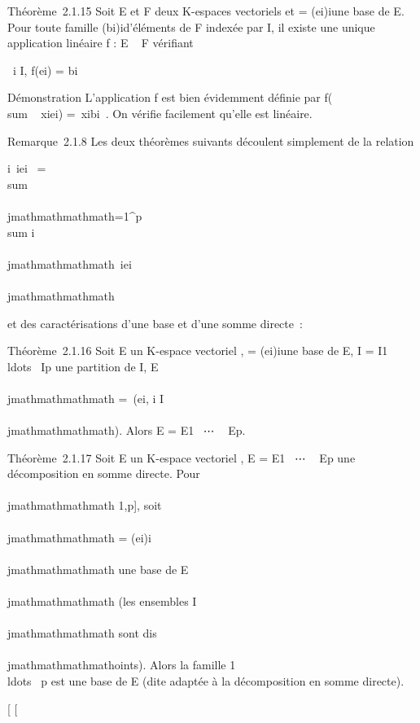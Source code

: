 Théorème~2.1.15 Soit E et F deux K-espaces vectoriels et  =
(ei)i\inI une base de E. Pour toute famille
(bi)i\inI d'éléments de F indexée par I, il existe une
unique application linéaire f : E \rightarrow~ F vérifiant

\forall~i \in I, f(ei) = bi~

Démonstration L'application f est bien évidemment définie par
f(\\sum ~
xiei) =\
\sum  xibi~. On vérifie
facilement qu'elle est linéaire.

Remarque~2.1.8 Les deux théorèmes suivants découlent simplement de la
relation

\sum i\inI\alpha~iei~ =
\\sum
\\\\jmathmathmathmath=1^p\underbrace
\\sum
i\inI\\\\jmathmathmathmath\alpha~iei \inE\\\\jmathmathmathmath

et des caractérisations d'une base et d'une somme directe~:

Théorème~2.1.16 Soit E un K-espace vectoriel ,  =
(ei)i\inI une base de E, I = I1
\cup\\ldots~ \cup
Ip une partition de I, E\\\\jmathmathmathmath =\
\mathrmVect(ei, i \in I\\\\jmathmathmathmath). Alors
E = E1 \oplus~⋯ \oplus~ Ep.

Théorème~2.1.17 Soit E un K-espace vectoriel , E = E1
\oplus~⋯ \oplus~ Ep une décomposition en somme
directe. Pour \\\\jmathmathmathmath \in {[}1,p{]}, soit \\\\jmathmathmathmath =
(ei)i\inI\\\\jmathmathmathmath une base de E\\\\jmathmathmathmath (les
ensembles I\\\\jmathmathmathmath sont dis\\\\jmathmathmathmathoints). Alors la famille 1
\cup\\ldots~
\cup\mathcal{E}p est une base de E (dite adaptée à la décomposition en
somme directe).

{[}
{[}

